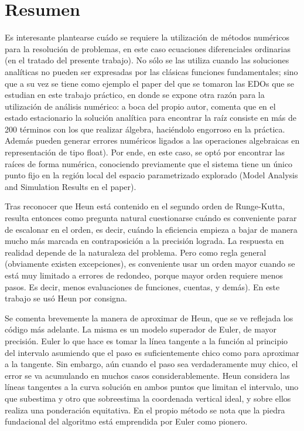 \section{Resumen}

	\hspace{1cm}Es interesante plantearse cu\'ado se requiere la utilizaci\'on de m\'etodos num\'ericos para la resolución de problemas, en este caso ecuaciones diferenciales ordinarias (en el tratado del presente trabajo). No sólo se las utiliza cuando las soluciones analíticas no pueden ser expresadas por las clásicas funciones fundamentales; sino que a su vez se tiene como ejemplo el paper del que se tomaron las EDOs que se estudian en este trabajo práctico, en donde se expone otra razón para la utilización de análisis numérico: a boca del propio autor, comenta que en el estado estacionario la solución analítica para encontrar la raíz consiste en más de 200 términos con los que realizar álgebra, haciéndolo engorroso en la práctica. Además pueden generar errores numéricos ligados a las operaciones algebraicas en representación de tipo float). Por ende, en este caso, se optó por encontrar las raíces de forma numérica, conociendo previamente que el sistema tiene un único punto fijo en la región local del espacio parametrizado explorado (Model Analysis and Simulation Results en el paper).

\hspace{1cm}Tras reconocer que Heun está contenido en el segundo orden de Runge-Kutta, resulta entonces como pregunta natural cuestionarse cuándo es conveniente parar de escalonar en el orden, es decir, cuándo la eficiencia empieza a bajar de manera mucho más marcada en contraposición a la precisión lograda. La respuesta en realidad depende de la naturaleza del problema. Pero como regla general (obviamente existen excepciones), es conveniente usar un orden mayor cuando se está muy limitado a errores de redondeo, porque mayor orden requiere menos pasos. Es decir, menos evaluaciones de funciones, cuentas, y demás). En este trabajo se usó Heun por consigna.

\hspace{1cm}Se comenta brevemente la manera de aproximar de Heun, que se ve reflejada los código m\'as adelante. La misma es un modelo superador de Euler, de mayor precisión. Euler lo que hace es tomar la línea tangente a la función al principio del intervalo asumiendo que el paso es suficientemente chico como para aproximar a la tangente. Sin embargo, aún cuando el paso sea verdaderamente muy chico, el error se va acumulando en muchos casos considerablemente. Heun considera las líneas tangentes a la curva solución en ambos puntos que limitan el intervalo, uno que subestima y otro que sobreestima la coordenada vertical ideal, y sobre ellos realiza una ponderación equitativa. En el propio método se nota que la piedra fundacional del algoritmo está emprendida por Euler como pionero.

